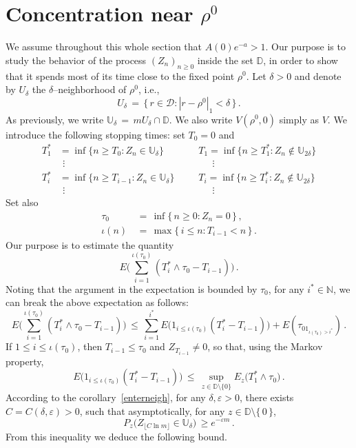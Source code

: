 \documentclass[a4paper,12pt]{article}
\theoremstyle{definition}
\theoremstyle{remark}
\def \cD {\mathcal{D}}
\def \d {\delta}
\def \e {\varepsilon}
\def \dD {\mathbb{D}}
\def \N {\mathbb{N}}
\def \dU {\mathbb{U}}
\def \exa {e^{-a}}
\begin{document}
\section{Concentration near \texorpdfstring{$\rho^0$}{rho0}}\label{Conc}
We assume throughout this whole section that $A(0)\exa>1$.
Our purpose is to study the behavior of the process $(Z_n)_{n\geq 0}$
inside the set $\dD$,
in order to show that it spends most of its time close to the fixed point $\rho^0$.
Let $\d>0$ and denote by $U_\d$ the $\d$--neighborhood of $\rho^0$, i.e.,
$$U_\d\,=\,\big\lbrace\,
r\in\cD:|r-\rho^0|_1<\d
\,\big\rbrace\,.$$
As previously, we write $\dU_\d\,=\,m U_\d\cap \dD$.
We also write $V(\rho^0,0)$ simply as $V$.
We introduce the following stopping times:
set $T_0=0$ and
\begin{align*}
T^*_{1}&=\inf\big\lbrace
n\geq T_{0}:
Z_n\in\dU_\d
\big\rbrace\qquad
&&T_{1}=\inf\big\lbrace
n\geq T^*_{1}:
Z_n\not\in\dU_{2\d}
\big\rbrace\\
&\ \, \vdots &&\ \ \quad\vdots\\
T^*_{i}&=\inf\big\lbrace
n\geq T_{i-1}:
Z_n\in\dU_\d
\big\rbrace\ 
&&T_{i}=\inf\big\lbrace
n\geq T^*_{i}:
Z_n\not\in\dU_{2\d}
\big\rbrace\\
&\ \, \vdots &&\ \ \quad\vdots
\end{align*}
Set also
\begin{align*}
\tau_0\,&=\,\inf\big\lbrace\,
n\geq0 : Z_n=0
\,\big\rbrace\,,\\
        \iota(n)\,&=\,\max\big\lbrace\,
i\leq n: T_{i-1}< n
\,\big\rbrace\,.
\end{align*}
Our purpose is to estimate the quantity
$$
E\bigg(
\sum_{i=1}^{\iota(\tau_0)}(T^*_i\wedge\tau_0-T_{i-1})
\bigg)\,.  $$
Noting that the argument in the expectation is bounded by $\tau_0$,
for any $i^*\in\N$, we can break the above expectation as follows:
$$E\bigg(
\sum_{i=1}^{\iota(\tau_0)}(T^*_i\wedge\tau_0-T_{i-1})
\bigg)\,\leq\,\sum_{i=1}^{i^*}
E\big(
1_{i\leq \iota(\tau_0)}(T_i^*-T_{i-1})
\big)+E(\tau_01_{\iota(\tau_0)>i^*})\,.
$$
If $1\leq i\leq \iota(\tau_0)$, then $T_{i-1}\leq \tau_0$ and $Z_{T_{i-1}}\neq 0$,
so that, using the Markov property,
$$
E\big(
1_{i\leq \iota(\tau_0)}(T_i^*-T_{i-1})
\big)\,\leq\,\sup_{z\in\dD\setminus\lbrace 0\rbrace}E_z\big(
T_1^*\wedge \tau_0
\big)\,.
$$
According to the corollary~\ref{enterneigh},
for any $\d,\e>0$, there exists $C=C(\d,\e)>0$,
such that asymptotically, for any $z\in\dD\setminus\lbrace\,0\,\rbrace$,
$$P_z\big(
Z_{\lfloor C\ln m\rfloor}\in\dU_\d
\big)\,\geq e^{-\e m}\,.$$
From this inequality we deduce the following bound.
\end{document}
